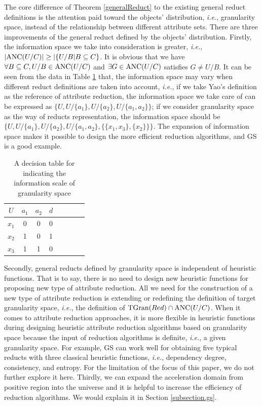 \documentclass[review]{elsarticle}
\begin{document}
		\par The core difference of Theorem \ref{generalReduct} to the existing general reduct definitions is the attention paid toward the objects' distribution, \emph{i.e.}, granularity space, instead of the relationship between different attribute sets. There are three improvements of the general reduct defined by the objects' distribution. Firstly, the information space we take into consideration is greater, \emph{i.e.}, $|{\rm ANC}(U/C)|\geq |\{U/B|B \subseteq C\}$. It is obvious that we have $\forall B \subseteq C, U/B \in {\rm ANC}(U/C)$ and $\exists G \in {\rm ANC}(U/C)$ satisfies $G \neq U/B$. It can be seen from the data in Table \ref{tab:0} that, the information space may vary when different reduct definitions are taken into account, \emph{i.e.}, if we take Yao's definition as the reference of attribute reduction, the information space we take care of can be expressed as $\{U, U/\{a_1\},U/\{a_2\},U/\{a_1,a_2\}\}$; if we consider granularity space as the way of reducts representation, the information space should be $\{U, U/\{a_1\},U/\{a_2\},U/\{a_1,a_2\}, \{\{x_1,x_3\},\{x_2\}\}\}$. The expansion of information space makes it possible to design the more efficient reduction algorithms, and GS is a good example.
		\begin{table}[htbp]
			\caption{A decision table for indicating the information scale of granularity space}
			\centering
			\begin{tabular}{cccccccc}
				\hline
				$U$ & $a_{1}$ & $a_{2}$ & $d$\\
				\hline
				$x_{1}$ & 0 & 0 & 0\\
				$x_{2}$ & 1 & 0 & 1\\
				$x_{3}$ & 1 & 1 & 0\\
				\hline
			\end{tabular}
			\label{tab:0}
		\end{table}
		Secondly, general reducts defined by granularity space is independent of heuristic functions. That is to say, there is no need to design new heuristic functions for proposing new type of attribute reduction. All we need for the construction of a new type of attribute reduction is extending or redefining the definition of target granularity space, \emph{i.e.}, the definition of ${\rm TGran}(Red) \cap {\rm ANC}(U/C)$. When it comes to attribute reduction approaches, it is more flexible in heuristic functions during designing heuristic attribute reduction algorithms based on granularity space because the input of reduction algorithms is definite, \emph{i.e.}, a given granularity space. For example, GS can work well for obtaining five typical reducts with three classical heuristic functions, \emph{i.e.}, dependency degree, consistency, and entropy. For the limitation of the focus of this paper, we do not further explore it here. Thirdly, we can expand the acceleration domain from positive region into the universe and it is helpful to increase the efficiency of reduction algorithms. We would explain it in Section \ref{subsection.gs}.
		 
\end{document}
